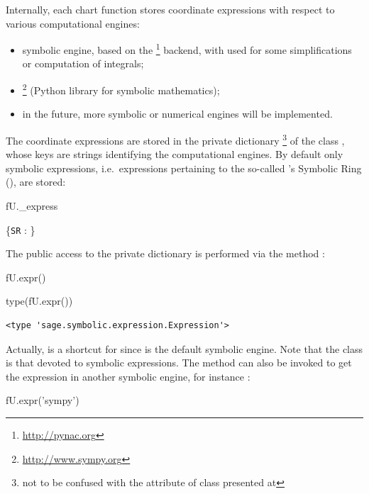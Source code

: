 Internally, each chart function stores coordinate expressions with respect
to various computational engines:
\begin{itemize}
\item \Sage{} symbolic engine, based on the \footnote{\url{http://pynac.org}} backend, with  used for some simplifications
or computation of integrals;
\item {}\footnote{\url{http://www.sympy.org}} (Python library for symbolic mathematics);
\item in the future, more symbolic or numerical engines will be implemented.
\end{itemize}
The coordinate expressions are stored in the private dictionary \footnote{not to be confused with
the attribute  of class  presented
at }
of the class ,
whose keys are strings identifying the computational engines. By default
only \Sage{} symbolic expressions, i.e.\ expressions pertaining
to the so-called \Sage{}'s Symbolic Ring (),
are stored:
\begin{NBin}
fU._express
\end{NBin}
\begin{NBoutM}
\left\{\verb|SR| : \right\}
\end{NBoutM}
The public access to the private dictionary  is performed via the
method :
\begin{NBin}
fU.expr()
\end{NBin}
\begin{NBoutM}
\end{NBoutM}
\begin{NBin}
type(fU.expr())
\end{NBin}
\begin{NBout}
\begin{verbatim}
<type 'sage.symbolic.expression.Expression'>
\end{verbatim}
\end{NBout}
Actually,  is a shortcut for  since
 is the default symbolic engine. Note that the class
 is that devoted to \Sage{} symbolic expressions.
The method  can also be invoked to get the expression in
another symbolic engine, for instance :
\begin{NBin}
fU.expr('sympy')
\end{NBin}
